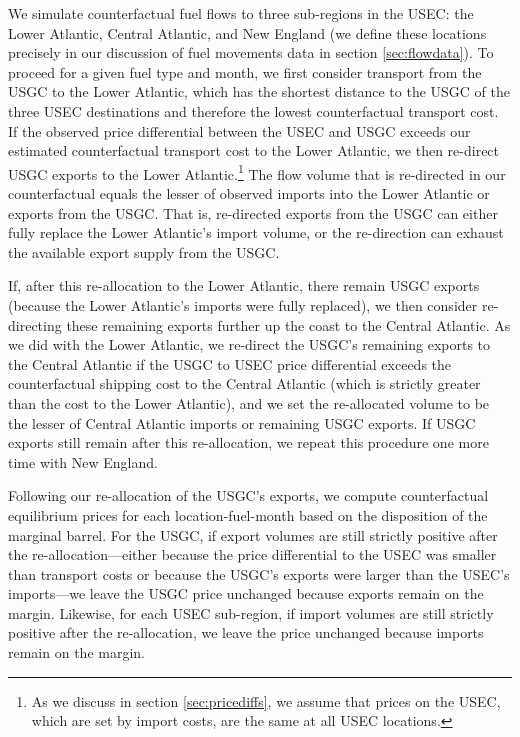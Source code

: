 \documentclass[12pt]{article}
\begin{document}
We simulate counterfactual fuel flows to three sub-regions in the USEC: the Lower Atlantic, Central Atlantic, and New England (we define these locations precisely in our discussion of fuel movements data in section \ref{sec:flowdata}). To proceed for a given fuel type and month, we first consider transport from the USGC to the Lower Atlantic, which has the shortest distance to the USGC of the three USEC destinations and therefore the lowest counterfactual transport cost. If the observed price differential between the USEC and USGC exceeds our estimated counterfactual transport cost to the Lower Atlantic, we then re-direct USGC exports to the Lower Atlantic.\footnote{As we discuss in section \ref{sec:pricediffs}, we assume that prices on the USEC, which are set by import costs, are the same at all USEC locations.} The flow volume that is re-directed in our counterfactual equals the lesser of observed imports into the Lower Atlantic or exports from the USGC. That is, re-directed exports from the USGC can either fully replace the Lower Atlantic's import volume, or the re-direction can exhaust the available export supply from the USGC.

If, after this re-allocation to the Lower Atlantic, there remain USGC exports (because the Lower Atlantic's imports were fully replaced), we then consider re-directing these remaining exports further up the coast to the Central Atlantic. As we did with the Lower Atlantic, we re-direct the USGC's remaining exports to the Central Atlantic if the USGC to USEC price differential exceeds the counterfactual shipping cost to the Central Atlantic (which is strictly greater than the cost to the Lower Atlantic), and we set the re-allocated volume to be the lesser of Central Atlantic imports or remaining USGC exports. If USGC exports still remain after this re-allocation, we repeat this procedure one more time with New England.

Following our re-allocation of the USGC's exports, we compute counterfactual equilibrium prices for each location-fuel-month based on the disposition of the marginal barrel. For the USGC, if export volumes are still strictly positive after the re-allocation---either because the price differential to the USEC was smaller than transport costs or because the USGC's exports were larger than the USEC's imports---we leave the USGC price unchanged because exports remain on the margin. Likewise, for each USEC sub-region, if import volumes are still strictly positive after the re-allocation, we leave the price unchanged because imports remain on the margin.
\end{document}
